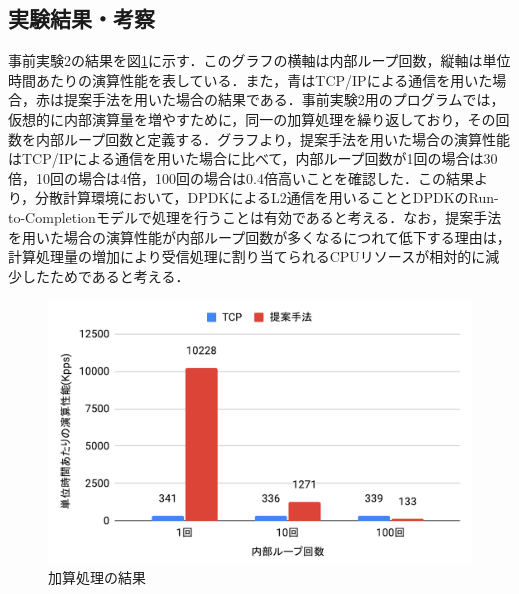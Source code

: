 \subsection{実験結果・考察}
事前実験2の結果を図\ref{fig:PreEvaluationTwoResult}に示す．このグラフの横軸は内部ループ回数，縦軸は単位時間あたりの演算性能を表している．また，青はTCP/IPによる通信を用いた場合，赤は提案手法を用いた場合の結果である．事前実験2用のプログラムでは，仮想的に内部演算量を増やすために，同一の加算処理を繰り返しており，その回数を内部ループ回数と定義する．グラフより，提案手法を用いた場合の演算性能はTCP/IPによる通信を用いた場合に比べて，内部ループ回数が1回の場合は30倍，10回の場合は4倍，100回の場合は0.4倍高いことを確認した．この結果より，分散計算環境において，DPDKによるL2通信を用いることとDPDKのRun-to-Completionモデルで処理を行うことは有効であると考える．なお，提案手法を用いた場合の演算性能が内部ループ回数が多くなるにつれて低下する理由は，計算処理量の増加により受信処理に割り当てられるCPUリソースが相対的に減少したためであると考える．

\begin{figure}[htb]
  \centering
  \includegraphics[width=\columnwidth]{pictures/PreExperimentTwoResult.pdf}
  \caption{加算処理の結果}
  \label{fig:PreEvaluationTwoResult}
\end{figure}

